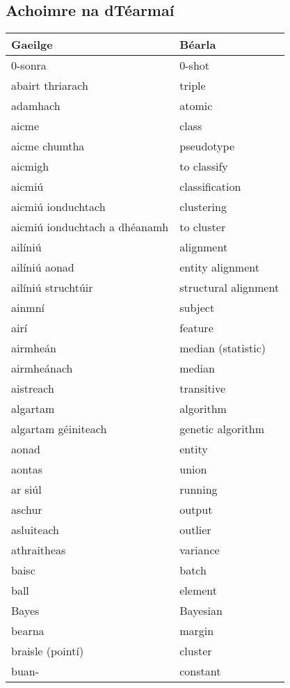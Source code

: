 \subsection{Achoimre na dTéarmaí}
\begin{longtable}{|l|l|}
	\hline
		\textbf{Gaeilge} & \textbf{Béarla}\\ \hline 
		0-sonra&0-shot\\ \hline 
		abairt thriarach&triple\\ \hline 
		adamhach&atomic\\ \hline 
		aicme&class\\ \hline 
		aicme chumtha&pseudotype\\ \hline 
		aicmigh&to classify\\ \hline 
		aicmiú&classification\\ \hline 
		aicmiú ionduchtach&clustering\\ \hline 
		aicmiú ionduchtach a dhéanamh&to cluster\\ \hline 
		ailíniú&alignment\\ \hline 
		ailíniú aonad&entity alignment\\ \hline 
		ailíniú struchtúir&structural alignment\\ \hline 
		ainmní&subject\\ \hline 
		airí&feature\\ \hline 
		airmheán&median (statistic)\\ \hline 
		airmheánach&median\\ \hline 
		aistreach&transitive\\ \hline 
		algartam&algorithm\\ \hline 
		algartam géiniteach&genetic algorithm\\ \hline 
		aonad&entity\\ \hline 
		aontas&union\\ \hline 
		ar siúl&running\\ \hline 
		aschur&output\\ \hline 
		asluiteach&outlier\\ \hline 
		athraitheas&variance\\ \hline 
		baisc&batch\\ \hline 
		ball&element\\ \hline 
		Bayes&Bayesian\\ \hline 
		bearna&margin\\ \hline 
		braisle (pointí)&cluster\\ \hline 
		buan-&constant\\ \hline 

\end{longtable}
